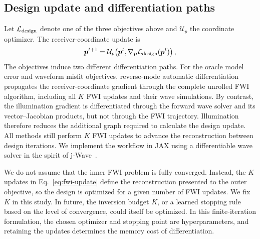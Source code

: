 \subsection{Design update and differentiation paths}

Let $\mathcal{L}_{\mathrm{design}}$ denote one of the three objectives above and $\mathcal{U}_{p}$
the coordinate optimizer. The receiver-coordinate update is
\begin{equation}
  \boldsymbol{p}^{t+1}
  = \mathcal{U}_{p}\!\left(
       \boldsymbol{p}^{t},
       \nabla_{\boldsymbol{p}}\mathcal{L}_{\mathrm{design}}(\boldsymbol{p}^{t})
     \right),
  \label{eq:design-update}
\end{equation}
The objectives induce two different differentiation paths. For the oracle
model error and waveform misfit
objectives, reverse-mode automatic differentiation propagates the
receiver-coordinate gradient through the complete unrolled FWI algorithm,
including all $K$ FWI updates and their wave simulations. By contrast, the
illumination gradient is differentiated through the forward wave solver and
its vector--Jacobian products, but not through the FWI trajectory.  Illumination therefore reduces the additional graph required to
calculate the design update. All methods
still perform $K$ FWI updates to advance the reconstruction between design
iterations. We implement the workflow in JAX using a differentiable wave solver
in the spirit of j-Wave~\citep{stanziola2023jwave}.

We do not assume that the inner FWI problem is fully converged. Instead, the
$K$ updates in Eq.~\eqref{eq:fwi-update} define the reconstruction presented to
the outer objective, so the design is optimized for a given number of FWI
updates. We fix $K$ in this study. In future, the inversion budget $K$, or a
learned stopping rule based on the level of convergence, could itself be
optimized. In this finite-iteration formulation, the chosen optimizer and
stopping point are hyperparameters, and retaining the updates determines the
memory cost of differentiation.
